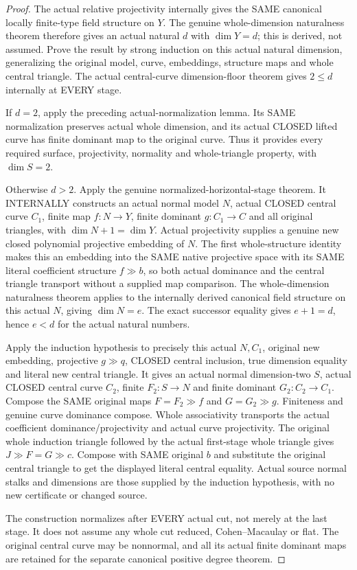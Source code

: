 \begin{proof}
The actual relative projectivity internally gives the SAME canonical
locally finite-type field structure on $Y$. The genuine whole-dimension
naturalness theorem therefore gives an actual natural $d$ with
$\dim Y=d$; this is derived, not assumed. Prove the result by strong
induction on this actual natural dimension, generalizing the original
model, curve, embeddings, structure maps and whole central triangle.
The actual central-curve dimension-floor theorem gives $2\le d$
internally at EVERY stage.

If $d=2$, apply the preceding actual-normalization lemma. Its SAME
normalization preserves actual whole dimension, and its actual CLOSED
lifted curve has finite dominant map to the original curve. Thus it
provides every required surface, projectivity, normality and whole-triangle
property, with $\dim S=2$.

Otherwise $d>2$. Apply the genuine normalized-horizontal-stage theorem.
It INTERNALLY constructs an actual normal model $N$, actual CLOSED
central curve $C_1$, finite map $f:N\to Y$, finite dominant
$g:C_1\to C$ and all original triangles, with
$\dim N+1=\dim Y$. Actual projectivity supplies a genuine new closed
polynomial projective embedding of $N$. The first whole-structure
identity makes this an embedding into the SAME native projective space
with its SAME literal coefficient structure $f\gg b$, so both actual
dominance and the central triangle transport without a supplied map
comparison. The whole-dimension naturalness theorem applies to the
internally derived canonical field structure on this actual $N$,
giving $\dim N=e$. The exact successor equality gives $e+1=d$,
hence $e<d$ for the actual natural numbers.

Apply the induction hypothesis to precisely this actual $N,C_1$,
original new embedding, projective $g\gg q$, CLOSED central inclusion,
true dimension equality and literal new central triangle. It gives
an actual normal dimension-two $S$, actual CLOSED central curve $C_2$,
finite $F_2:S\to N$ and finite dominant $G_2:C_2\to C_1$.
Compose the SAME original maps $F=F_2\gg f$ and $G=G_2\gg g$.
Finiteness and genuine curve dominance compose. Whole associativity
transports the actual coefficient dominance/projectivity and actual
curve projectivity. The original whole induction triangle followed by
the actual first-stage whole triangle gives $J\gg F=G\gg c$.
Compose with SAME original $b$ and substitute the original central
triangle to get the displayed literal central equality. Actual source
normal stalks and dimensions are those supplied by the induction
hypothesis, with no new certificate or changed source.

The construction normalizes after EVERY actual cut, not merely at the
last stage. It does not assume any whole cut reduced, Cohen--Macaulay
or flat. The original central curve may be nonnormal, and all its actual
finite dominant maps are retained for the separate canonical positive
degree theorem.
\end{proof}

